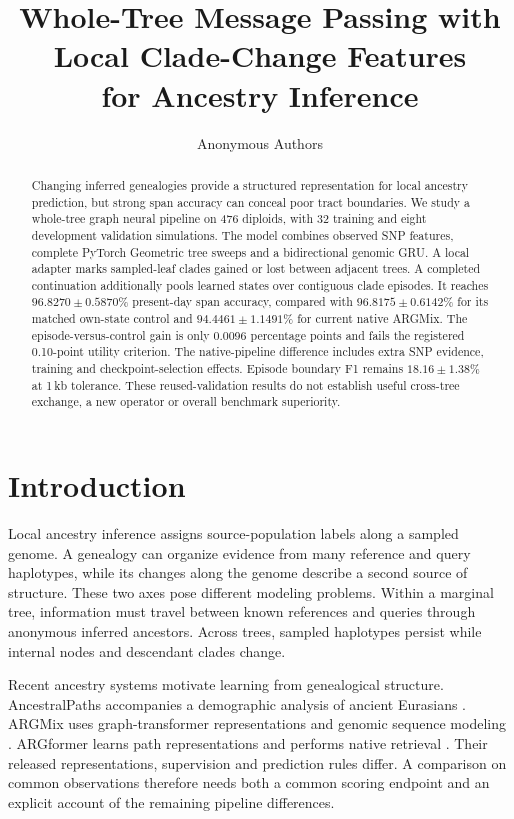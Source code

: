 \documentclass[letterpaper]{article}
\title{Whole-Tree Message Passing with Local Clade-Change Features\\
for Ancestry Inference}
\author{Anonymous Authors}
\begin{document}
\maketitle
\begin{abstract}
Changing inferred genealogies provide a structured representation for local ancestry prediction, but strong span accuracy can conceal poor tract boundaries. We study a whole-tree graph neural pipeline on 476 diploids, with 32 training and eight development validation simulations. The model combines observed SNP features, complete PyTorch Geometric tree sweeps and a bidirectional genomic GRU. A local adapter marks sampled-leaf clades gained or lost between adjacent trees. A completed continuation additionally pools learned states over contiguous clade episodes. It reaches $96.8270\pm0.5870\%$ present-day span accuracy, compared with $96.8175\pm0.6142\%$ for its matched own-state control and $94.4461\pm1.1491\%$ for current native ARGMix. The episode-versus-control gain is only 0.0096 percentage points and fails the registered 0.10-point utility criterion. The native-pipeline difference includes extra SNP evidence, training and checkpoint-selection effects. Episode boundary F1 remains $18.16\pm1.38\%$ at 1\,kb tolerance. These reused-validation results do not establish useful cross-tree exchange, a new operator or overall benchmark superiority.
\end{abstract}

\section{Introduction}
Local ancestry inference assigns source-population labels along a sampled genome. A genealogy can organize evidence from many reference and query haplotypes, while its changes along the genome describe a second source of structure. These two axes pose different modeling problems. Within a marginal tree, information must travel between known references and queries through anonymous inferred ancestors. Across trees, sampled haplotypes persist while internal nodes and descendant clades change.

Recent ancestry systems motivate learning from genealogical structure. AncestralPaths accompanies a demographic analysis of ancient Eurasians \citep{eurasians2024}. ARGMix uses graph-transformer representations and genomic sequence modeling \citep{ancientancestry2026}. ARGformer learns path representations and performs native retrieval \citep{argformer2026}. Their released representations, supervision and prediction rules differ. A comparison on common observations therefore needs both a common scoring endpoint and an explicit account of the remaining pipeline differences.
\end{document}
